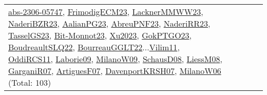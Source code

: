 {\begin{longtable}{p{3cm}r>{\raggedright\arraybackslash}p{6cm}>{\raggedright\arraybackslash}p{6cm}>{\raggedright\arraybackslash}p{8cm}}
\hyperref[detail:abs-2306-05747]{abs-2306-05747}, \hyperref[detail:FrimodigECM23]{FrimodigECM23}, \hyperref[detail:LacknerMMWW23]{LacknerMMWW23}, \hyperref[detail:NaderiBZR23]{NaderiBZR23}, \hyperref[detail:AalianPG23]{AalianPG23}, \hyperref[detail:AbreuPNF23]{AbreuPNF23}, \hyperref[detail:NaderiRR23]{NaderiRR23}, \hyperref[detail:TasselGS23]{TasselGS23}, \hyperref[detail:Bit-Monnot23]{Bit-Monnot23}, \hyperref[detail:Xu2023]{Xu2023}, \hyperref[detail:GokPTGO23]{GokPTGO23}, \hyperref[detail:BoudreaultSLQ22]{BoudreaultSLQ22}, \hyperref[detail:BourreauGGLT22]{BourreauGGLT22}...\hyperref[detail:Vilim11]{Vilim11}, \hyperref[detail:OddiRCS11]{OddiRCS11}, \hyperref[detail:Laborie09]{Laborie09}, \hyperref[detail:MilanoW09]{MilanoW09}, \hyperref[detail:SchausD08]{SchausD08}, \hyperref[detail:LiessM08]{LiessM08}, \hyperref[detail:GarganiR07]{GarganiR07}, \hyperref[detail:ArtiguesF07]{ArtiguesF07}, \hyperref[detail:DavenportKRSH07]{DavenportKRSH07}, \hyperref[detail:MilanoW06]{MilanoW06} (Total: 103)\\

\end{longtable}}
